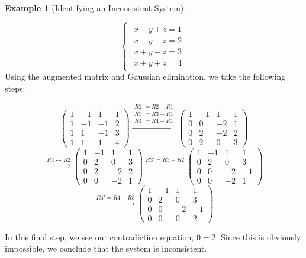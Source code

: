 \documentclass[
]{article}
\theoremstyle{definition}
\theoremstyle{definition}
\newtheorem{example}{Example}[section]
\theoremstyle{definition}
\theoremstyle{definition}
\theoremstyle{remark}
\begin{document}
\begin{example}[Identifying an Inconsistent System]
\protect\hypertarget{exm:inconsistent}{}\label{exm:inconsistent}

\[\begin{cases}\begin{align}
x-y+z=1\\
x-y-z=2\\
x+y-z=3\\
x+y+z=4\end{align}\end{cases}\]
Using the augmented matrix and Gaussian elimination, we take the following steps:

\[\left(\begin{array}{rrr|r} 1&-1&1&1\\1&-1&-1&2\\1&1&-1&3\\1&1&1&4\end{array}\right) \xrightarrow{\substack{R2'=R2-R1 \\ R3'=R3-R1 \\ R4'=R4-R1}} \left(\begin{array}{rrr|r} 1&-1&1&1\\0&0&-2&1\\0&2&-2&2\\0&2&0&3\end{array}\right) \]
\[\xrightarrow{ R4\leftrightarrow R2}\left(\begin{array}{rrr|r} 1&-1&1&1\\0&2&0&3\\0&2&-2&2\\0&0&-2&1\end{array}\right)\xrightarrow{R3'=R3-R2} \left(\begin{array}{rrr|r} 1&-1&1&1\\0&2&0&3\\0&0&-2&-1\\0&0&-2&1\end{array}\right)\]
\[\xrightarrow{R4'=R4-R3} \left(\begin{array}{rrr|r} 1&-1&1&1\\0&2&0&3\\0&0&-2&-1\\0&0&0&2\end{array}\right)\]

In this final step, we see our contradiction equation, \(0=2\). Since this is obviously impossible, we conclude that the system is inconsistent.

\end{example}
\end{document}
